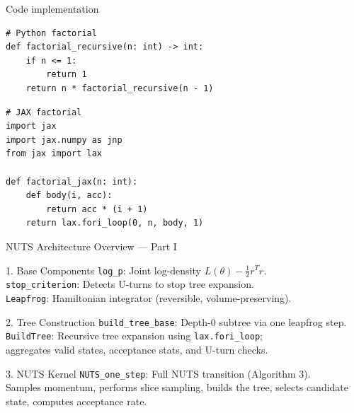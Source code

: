 \documentclass[aspectratio=43]{beamer}
\begin{document}
\begin{frame}[fragile]{Code implementation}
	
\begin{lstlisting}
# Python factorial
def factorial_recursive(n: int) -> int:
	if n <= 1:
		return 1
	return n * factorial_recursive(n - 1)
\end{lstlisting}

\pause

\begin{lstlisting}
# JAX factorial
import jax
import jax.numpy as jnp
from jax import lax

def factorial_jax(n: int):
	def body(i, acc):
		return acc * (i + 1)
	return lax.fori_loop(0, n, body, 1)
\end{lstlisting}
	
\end{frame}


\begin{frame}{\large{NUTS Architecture Overview — Part I}}
	
	{\small
		
		\begin{block}{1. Base Components}
			\texttt{log\_p}: Joint log-density \(L(\theta) - \frac12 r^T r\).  \\
			\texttt{stop\_criterion}: Detects U-turns to stop tree expansion.  \\
			\texttt{Leapfrog}: Hamiltonian integrator (reversible, volume-preserving).
		\end{block}
		
		\begin{block}{2. Tree Construction}
			\texttt{build\_tree\_base}: Depth-0 subtree via one leapfrog step. \\ 
			\texttt{BuildTree}: Recursive tree expansion using \texttt{lax.fori\_loop};  \\
			aggregates valid states, acceptance stats, and U-turn checks.
		\end{block}
		
		\begin{block}{3. NUTS Kernel}
			\texttt{NUTS\_one\_step}: Full NUTS transition (Algorithm 3).  \\
			Samples momentum, performs slice sampling, builds the tree,  
			selects candidate state, computes acceptance rate.
		\end{block}
		
	}
	
\end{frame}
\end{document}
